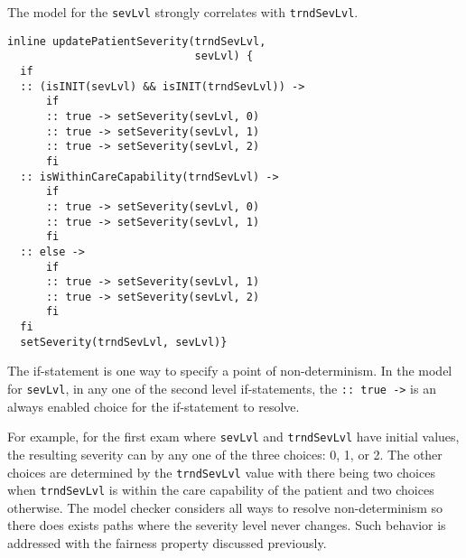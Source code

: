 The model for the \texttt{sevLvl} strongly correlates with \texttt{trndSevLvl}.
%
{\small
\begin{lstlisting}[style=myPromela]
inline updatePatientSeverity(trndSevLvl, 
                             sevLvl) {
  if
  :: (isINIT(sevLvl) && isINIT(trndSevLvl)) -> 
      if
      :: true -> setSeverity(sevLvl, 0)
      :: true -> setSeverity(sevLvl, 1)
      :: true -> setSeverity(sevLvl, 2)
      fi 
  :: isWithinCareCapability(trndSevLvl) -> 
      if
      :: true -> setSeverity(sevLvl, 0)
      :: true -> setSeverity(sevLvl, 1)
      fi
  :: else -> 
      if
      :: true -> setSeverity(sevLvl, 1)
      :: true -> setSeverity(sevLvl, 2)
      fi
  fi
  setSeverity(trndSevLvl, sevLvl)}
\end{lstlisting}
}
%
\noindent The if-statement is one way to specify a point of non-determinism. In the model for \texttt{sevLvl}, in any one of the second level if-statements, the \texttt{:: true ->} is an always enabled choice for the if-statement to resolve. 

For example, for the first exam where \texttt{sevLvl} and \texttt{trndSevLvl} have initial values, the resulting severity can by any one of the three choices: 0, 1, or 2. The other choices are determined by the \texttt{trndSevLvl} value with there being two choices when \texttt{trndSevLvl} is within the care capability of the patient and two choices otherwise. The model checker considers all ways to resolve non-determinism so there does exists paths where the severity level never changes. Such behavior is addressed with the fairness property discussed previously.

\begin{comment}
The final note is that the model synchronizes the value of \texttt{trndSevLvl} after choosing a value for \texttt{sevLvl}. The reasoning is that \texttt{sevLvl} should only be updated at the time of an actual exam. As such, \texttt{trndSevLvl} should reflect the outcome of that exam since the two values are strongly correlated.

Of note is that the model may never assign \texttt{sevLvl} to zero! It is possible for the model checker to resolve the non-determinism in such a way that \texttt{sevLvl} is always one. The result is that the patient may never be discharged and may never expire at the same time. Such behavior exists in the model but is not consistent with the real world. These are part of the sound over-approximation, and when necessary, are constrained out by changing the model or constraining what behaviors are considered in the model with a fairness property as discussed previously.
\end{comment}



